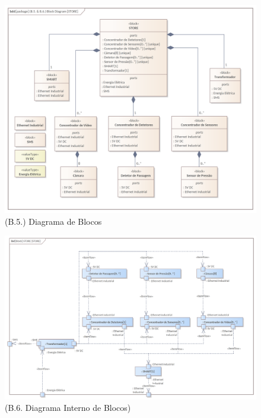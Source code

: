 \documentclass[12pt,a4paper]{article}
\begin{document}
\begin{landscape}
  \begin{figure}
    \centering
    \includegraphics[width=1.2\textwidth]{assets/ea-bdd-store.png}
    \caption{(B.5.) Diagrama de Blocos}
    \label{fig:bbd}
  \end{figure}
\end{landscape}

\begin{landscape}
  \begin{figure}
    \centering
    \includegraphics[width=1.5\textwidth]{assets/ea-ibd-store.png}
    \caption{(B.6. Diagrama Interno de Blocos)}
    \label{fig:ibd}
  \end{figure}
\end{landscape}
\end{document}
